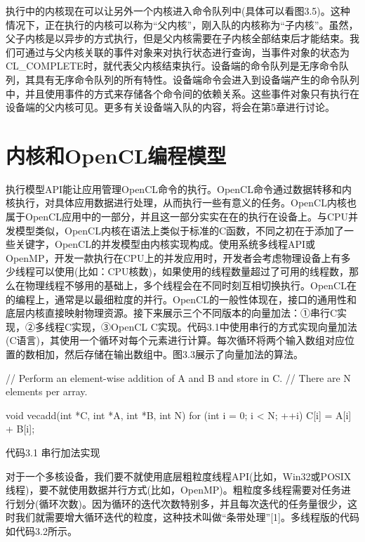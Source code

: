 执行中的内核现在可以让另外一个内核进入命令队列中(具体可以看图3.5)。这种情况下，正在执行的内核可以称为“父内核”，刚入队的内核称为“子内核”。虽然，父子内核是以异步的方式执行，但是父内核需要在子内核全部结束后才能结束。我们可通过与父内核关联的事件对象来对执行状态进行查询，当事件对象的状态为CL\_\allowbreak{}COMPLETE时，就代表父内核结束执行。设备端的命令队列是无序命令队列，其具有无序命令队列的所有特性。设备端命令会进入到设备端产生的命令队列中，并且使用事件的方式来存储各个命令间的依赖关系。这些事件对象只有执行在设备端的父内核可见。更多有关设备端入队的内容，将会在第5章进行讨论。



\section{内核和OpenCL编程模型}

执行模型API能让应用管理OpenCL命令的执行。OpenCL命令通过数据转移和内核执行，对具体应用数据进行处理，从而执行一些有意义的任务。OpenCL内核也属于OpenCL应用中的一部分，并且这一部分实实在在的执行在设备上。与CPU并发模型类似，OpenCL内核在语法上类似于标准的C函数，不同之初在于添加了一些关键字，OpenCL的并发模型由内核实现构成。使用系统多线程API或OpenMP，开发一款执行在CPU上的并发应用时，开发者会考虑物理设备上有多少线程可以使用(比如：CPU核数)，如果使用的线程数量超过了可用的线程数，那么在物理线程不够用的基础上，多个线程会在不同时刻互相切换执行。OpenCL在的编程上，通常是以最细粒度的并行。OpenCL的一般性体现在，接口的通用性和底层内核直接映射物理资源。接下来展示三个不同版本的向量加法：①串行C实现，②多线程C实现，③OpenCL C实现。代码3.1中使用串行的方式实现向量加法(C语言)，其使用一个循环对每个元素进行计算。每次循环将两个输入数组对应位置的数相加，然后存储在输出数组中。图3.3展示了向量加法的算法。

\begin{codebox}[cpp]
// Perform an element-wise addition of A and B and store in C.
// There are N elements per array.

void vecadd(int *C, int *A, int *B, int N){
  for (int i = 0; i < N; ++i){
    C[i] = A[i] + B[i];
  }
}
\end{codebox}

代码3.1 串行加法实现


对于一个多核设备，我们要不就使用底层粗粒度线程API(比如，Win32或POSIX线程)，要不就使用数据并行方式(比如，OpenMP)。粗粒度多线程需要对任务进行划分(循环次数)。因为循环的迭代次数特别多，并且每次迭代的任务量很少，这时我们就需要增大循环迭代的粒度，这种技术叫做“条带处理”[1]。多线程版的代码如代码3.2所示。

